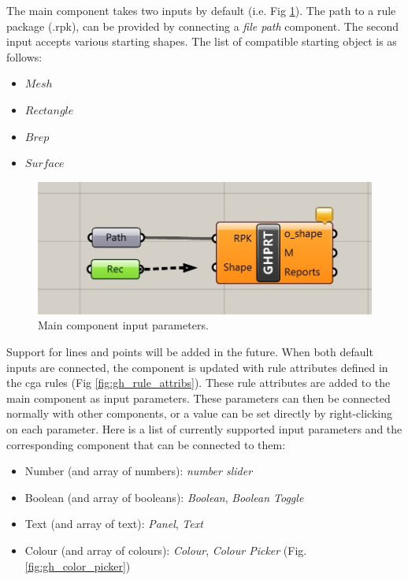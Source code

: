 The main component takes two inputs by default (i.e. Fig \ref{fig:gh_main_input}). The path to a rule package (.rpk), can be provided by connecting a \textit{file path} component. The second input accepts various starting shapes. The list of compatible starting object is as follows:
\begin{itemize}
    \item $Mesh$
    \item $Rectangle$
    \item $Brep$
    \item $Surface$
\end{itemize}

\begin{figure}[h]
    \centering
    \includegraphics{res/man_gh_init_shape}
    \caption{Main component input parameters.}
    \label{fig:gh_main_input}
\end{figure}

Support for lines and points will be added in the future. When both default inputs are connected, the component is updated with rule attributes defined in the cga rules (Fig \ref{fig:gh_rule_attribs}). These rule attributes are added to the main component as input parameters. These parameters can then be connected normally with other components, or a value can be set directly by right-clicking on each parameter. Here is a list of currently supported input parameters and the corresponding component that can be connected to them:
\begin{itemize}
    \item Number (and array of numbers): \textit{number slider}
    \item Boolean (and array of booleans): \textit{Boolean}, \textit{Boolean Toggle}
    \item Text (and array of text): \textit{Panel}, \textit{Text}
    \item Colour (and array of colours): \textit{Colour}, \textit{Colour Picker} (Fig. \ref{fig:gh_color_picker})
\end{itemize}

